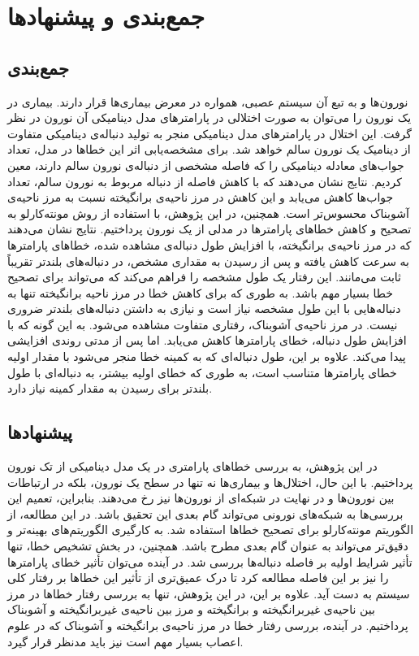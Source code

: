 \chapter{جمع‌بندی و پیشنهادها} \label{chap:discussion}

\section{جمع‌بندی}
نورون‌ها و به تبع آن سیستم عصبی، همواره در معرض بیماری‌ها قرار دارند.
بیماری در یک نورون را می‌توان به صورت اختلالی در پارامترهای مدل دینامیکی آن نورون در نظر گرفت.
این اختلال در پارامترهای مدل دینامیکی منجر به تولید دنباله‌ی دینامیکی متفاوت از دینامیک یک نورون سالم خواهد شد.
برای مشخصه‌یابی اثر این خطاها در مدل، تعداد جواب‌های معادله دینامیکی را که فاصله مشخصی از دنباله‌ی نورون سالم دارند، معین کردیم.
نتایج نشان می‌دهند که با کاهش فاصله از دنباله مربوط به نورون سالم، تعداد جواب‌ها کاهش می‌یابد و این کاهش در مرز ناحیه‌ی برانگیخته نسبت به مرز ناحیه‌ی آشوبناک محسوس‌تر است.
همچنین، در این پژوهش، با استفاده از روش مونته‌کارلو به تصحیح و کاهش خطاهای پارامترها در مدلی از یک نورون پرداختیم.
نتایج نشان می‌دهند که در مرز ناحیه‌ی برانگیخته، با افزایش طول دنباله‌ی مشاهده شده، خطاهای پارامترها به سرعت کاهش یافته و پس از رسیدن به مقداری مشخص، در دنباله‌های بلندتر تقریباً ثابت می‌مانند.
این رفتار یک طول مشخصه را فراهم می‌کند که می‌تواند برای تصحیح خطا بسیار مهم باشد.
به طوری که برای کاهش خطا در مرز ناحیه برانگیخته تنها به دنباله‌هایی با این طول مشخصه نیاز است و نیازی به داشتن دنباله‌های بلندتر ضروری نیست.
در مرز ناحیه‌ی آشوبناک، رفتاری متفاوت مشاهده می‌شود.
به این گونه که با افزایش طول دنباله، خطای پارامترها کاهش می‌یابد.
اما پس از مدتی روندی افزایشی پیدا می‌کند.
علاوه بر این، طول دنباله‌ای که به کمینه خطا منجر می‌شود با مقدار اولیه خطای پارامترها متناسب است، به طوری که خطای اولیه بیشتر، به دنباله‌ای با طول بلندتر برای رسیدن به مقدار کمینه نیاز دارد.

\section{پیشنهادها}
در این پژوهش، به بررسی خطاهای پارامتری در یک مدل دینامیکی از تک نورون پرداختیم.
با این حال، اختلا‌ل‌ها و بیماری‌ها نه تنها در سطح یک نورون، بلکه در ارتباطات بین نورون‌ها و در نهایت در شبکه‌ای از نورون‌ها نیز رخ می‌دهند.
بنابراین، تعمیم این بررسی‌ها به شبکه‌های نورونی می‌تواند گام بعدی این تحقیق باشد.
در این مطالعه، از الگوریتم مونته‌کارلو برای تصحیح خطاها استفاده شد.
به کارگیری الگوریتم‌های بهینه‌تر و دقیق‌تر می‌تواند به عنوان گام بعدی مطرح باشد.
همچنین، در بخش تشخیص خطا، تنها تأثیر شرایط اولیه بر فاصله دنباله‌ها بررسی شد.
در آینده می‌توان تأثیر خطای پارامترها را نیز بر این فاصله مطالعه کرد تا درک عمیق‌تری از تأثیر این خطاها بر رفتار کلی سیستم به دست آید.
علاوه بر این، در این پژوهش، تنها به بررسی رفتار خطاها در مرز بین ناحیه‌ی غیربرانگیخته و برانگیخته و مرز بین ناحیه‌ی غیربرانگیخته و آشوبناک پرداختیم.
در آینده، بررسی رفتار خطا در مرز ناحیه‌ی برانگیخته و آشوبناک که در علوم اعصاب بسیار مهم است نیز باید مدنظر قرار گیرد.
